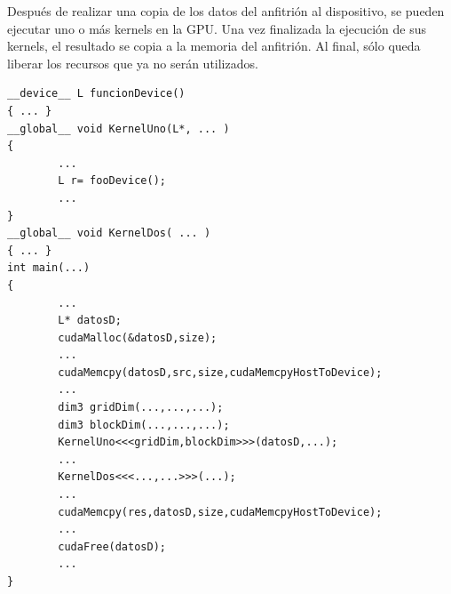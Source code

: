 Después de realizar una copia de los datos del anfitrión al dispositivo, se pueden ejecutar uno o más kernels en la GPU. Una vez finalizada la ejecución de sus kernels, el resultado se copia a la memoria del anfitrión. Al final, sólo queda liberar los recursos que ya no serán utilizados.
\singlespacing
{}
\begin{lstlisting}[caption=Estructura general de un programa en CUDA C.]
__device__ L funcionDevice()
{ ... } 
__global__ void KernelUno(L*, ... )
{
        ...
        L r= fooDevice();
        ...
}
__global__ void KernelDos( ... )
{ ... }
int main(...)
{       
        ...
        L* datosD;
        cudaMalloc(&datosD,size);
        ...             
        cudaMemcpy(datosD,src,size,cudaMemcpyHostToDevice);             
        ...     
        dim3 gridDim(...,...,...);
        dim3 blockDim(...,...,...);
        KernelUno<<<gridDim,blockDim>>>(datosD,...);    
        ...
        KernelDos<<<...,...>>>(...);
        ...
        cudaMemcpy(res,datosD,size,cudaMemcpyHostToDevice);
        ...
        cudaFree(datosD);
        ...                     
}
\end{lstlisting}

